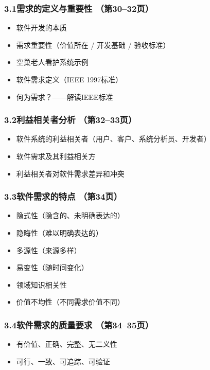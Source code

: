 \documentclass[12pt,a4paper]{ctexart}
\begin{document}
\subsubsection{3.1\quad 需求的定义与重要性 \hfill（第30--32页）}
\begin{itemize}
    \item 软件开发的本质
    \item 需求重要性（价值所在 / 开发基础 / 验收标准）
    \item 空巢老人看护系统示例
    \item 软件需求定义（IEEE 1997标准）
    \item 何为需求？——解读IEEE标准
\end{itemize}

\subsubsection{3.2\quad 利益相关者分析 \hfill（第32--33页）}
\begin{itemize}
    \item 软件系统的利益相关者（用户、客户、系统分析员、开发者）
    \item 软件需求及其利益相关方
    \item 利益相关者对软件需求差异和冲突
\end{itemize}

\subsubsection{3.3\quad 软件需求的特点 \hfill（第34页）}
\begin{itemize}
    \item 隐式性（隐含的、未明确表达的）
    \item 隐晦性（难以明确表达的）
    \item 多源性（来源多样）
    \item 易变性（随时间变化）
    \item 领域知识相关性
    \item 价值不均性（不同需求价值不同）
\end{itemize}

\subsubsection{3.4\quad 软件需求的质量要求 \hfill（第34--35页）}
\begin{itemize}
    \item 有价值、正确、完整、无二义性
    \item 可行、一致、可追踪、可验证
\end{itemize}
\end{document}
